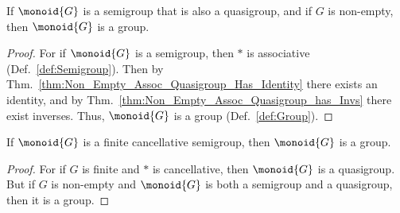         \begin{theorem}
            \label{thm:Non_Empty_Assoc_Quasigroup_is_Group}%
            If $\monoid{G}$ is a semigroup that is also a quasigroup, and if
            $G$ is non-empty, then $\monoid{G}$ is a group.
        \end{theorem}
        \begin{proof}
            For if $\monoid{G}$ is a semigroup, then $*$ is associative
            (Def.~\ref{def:Semigroup}). Then by
            Thm.~\ref{thm:Non_Empty_Assoc_Quasigroup_Has_Identity} there exists
            an identity, and by
            Thm.~\ref{thm:Non_Empty_Assoc_Quasigroup_has_Invs} there exist
            inverses. Thus, $\monoid{G}$ is a group (Def.~\ref{def:Group}).
        \end{proof}
        \begin{theorem}
            If $\monoid{G}$ is a finite cancellative semigroup, then
            $\monoid{G}$ is a group.
        \end{theorem}
        \begin{proof}
            For if $G$ is finite and $*$ is cancellative, then $\monoid{G}$ is a
            quasigroup. But if $G$ is non-empty and $\monoid{G}$ is both a
            semigroup and a quasigroup, then it is a group.
        \end{proof}
